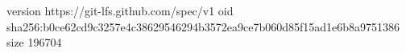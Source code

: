 version https://git-lfs.github.com/spec/v1
oid sha256:b0ce62cd9c3257e4c38629546294b3572ea9ce7b060d85f15ad1e6b8a9751386
size 196704
